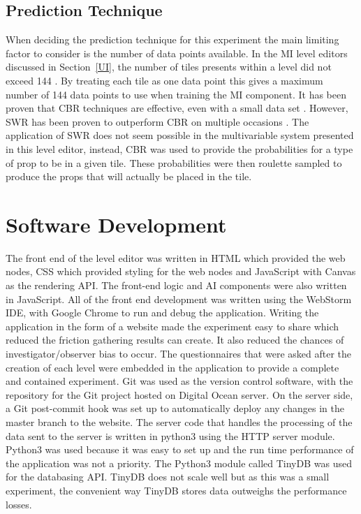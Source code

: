 \documentclass[journal]{IEEEtran}
\begin{document}
\subsection{Prediction Technique}
When deciding the prediction technique for this experiment the main limiting factor to consider is the number of data points available. In the MI level editors discussed in Section~\ref{UI},  the number of tiles presents within a level did not exceed 144 \cite{alvarez2018fostering, liapis2013sentient, baldwin2017mixed}. By treating each tile as one data point this gives a maximum number of 144 data points to use when training the MI component. It has been proven that CBR techniques are effective, even with a small data set \cite{shepperd2001comparing,wen2012systematic}. However, SWR has been proven to outperform CBR on multiple occasions \cite{shepperd2001comparing, schroeder2016understanding}. The application of SWR does not seem possible in the multivariable system presented in this level editor, instead, CBR was used to provide the probabilities for a type of prop to be in a given tile. These probabilities were then roulette sampled to produce the props that will actually be placed in the tile.  

\section{Software Development}
The front end of the level editor was written in HTML which provided the web nodes, CSS which provided styling for the web nodes and JavaScript with Canvas as the rendering API. The front-end logic and AI components were also written in JavaScript. All of the front end development was written using the WebStorm IDE, with Google Chrome to run and debug the application. Writing the application in the form of a website made the experiment easy to share which reduced the friction gathering results can create. It also reduced the chances of investigator/observer bias \cite{phillips1999double} to occur. The questionnaires that were asked after the creation of each level were embedded in the application to provide a complete and contained experiment. Git was used as the version control software, with the repository for the Git project hosted on Digital Ocean server. On the server side, a Git post-commit hook was set up to automatically deploy any changes in the master branch to the website. The server code that handles the processing of the data sent to the server is written in python3 using the HTTP server module. Python3 was used because it was easy to set up and the run time performance of the application was not a priority. The Python3 module called TinyDB was used for the databasing API. TinyDB does not scale well but as this was a small experiment, the convenient way TinyDB stores data outweighs the performance losses. 
\end{document}
